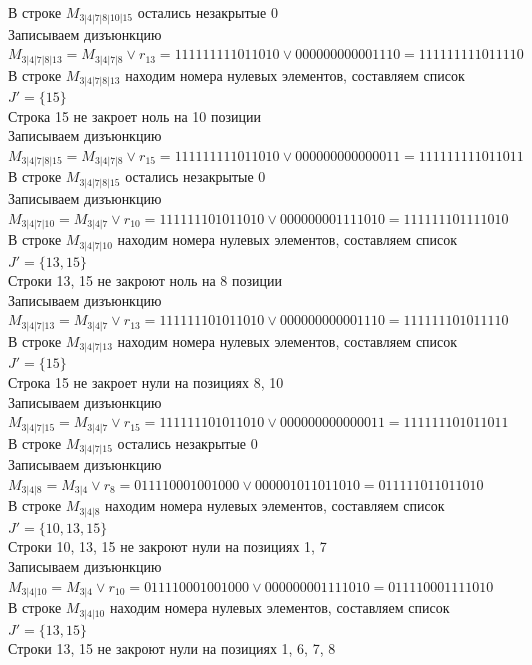 \documentclass[12pt,a4paper]{report}
\begin{document}
В строке $M_{3 | 4 | 7 | 8 | 10 | 15}$ остались незакрытые $0$ \\
Записываем дизъюнкцию $M_{3 | 4 | 7 | 8 | 13} = M_{3 | 4 | 7 | 8}\vee r_{13} = 111111111011010 \vee 000000000001110 = 111111111011110$ \\
В строке $M_{3 | 4 | 7 | 8 | 13}$ находим номера нулевых элементов, составляем список $J' = \{15\}$ \\
Строка 15 не закроет ноль на 10 позиции \\
Записываем дизъюнкцию $M_{3 | 4 | 7 | 8 | 15} = M_{3 | 4 | 7 | 8}\vee r_{15} = 111111111011010 \vee 000000000000011 = 111111111011011$ \\
В строке $M_{3 | 4 | 7 | 8 | 15}$ остались незакрытые $0$ \\
Записываем дизъюнкцию $M_{3 | 4 | 7 | 10} = M_{3 | 4 | 7}\vee r_{10} = 111111101011010 \vee 000000001111010 = 111111101111010$ \\
В строке $M_{3 | 4 | 7 | 10}$ находим номера нулевых элементов, составляем список $J' = \{13, 15\}$ \\
Строки 13, 15 не закроют ноль на 8 позиции \\
Записываем дизъюнкцию $M_{3 | 4 | 7 | 13} = M_{3 | 4 | 7}\vee r_{13} = 111111101011010 \vee 000000000001110 = 111111101011110$ \\
В строке $M_{3 | 4 | 7 | 13}$ находим номера нулевых элементов, составляем список $J' = \{15\}$ \\
Строка 15 не закроет нули на позициях 8, 10 \\
Записываем дизъюнкцию $M_{3 | 4 | 7 | 15} = M_{3 | 4 | 7}\vee r_{15} = 111111101011010 \vee 000000000000011 = 111111101011011$ \\
В строке $M_{3 | 4 | 7 | 15}$ остались незакрытые $0$ \\
Записываем дизъюнкцию $M_{3 | 4 | 8} = M_{3 | 4}\vee r_{8} = 011110001001000 \vee 000001011011010 = 011111011011010$ \\
В строке $M_{3 | 4 | 8}$ находим номера нулевых элементов, составляем список $J' = \{10, 13, 15\}$ \\
Строки 10, 13, 15 не закроют нули на позициях 1, 7 \\
Записываем дизъюнкцию $M_{3 | 4 | 10} = M_{3 | 4}\vee r_{10} = 011110001001000 \vee 000000001111010 = 011110001111010$ \\
В строке $M_{3 | 4 | 10}$ находим номера нулевых элементов, составляем список $J' = \{13, 15\}$ \\
Строки 13, 15 не закроют нули на позициях 1, 6, 7, 8 \\
\end{document}
